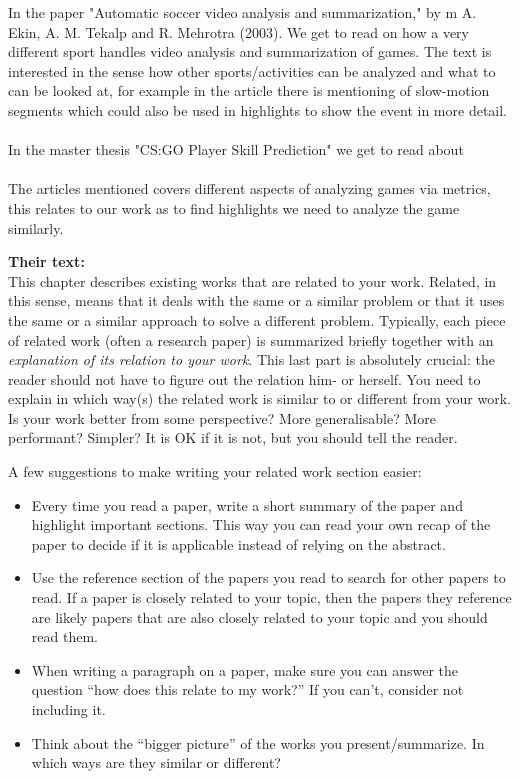 \documentclass[a4paper,twoside]{bth}
\begin{document}
In the paper  "Automatic soccer video analysis and summarization," by m A. Ekin, A. M. Tekalp and R. Mehrotra (2003). We get to read on how a very different sport handles video analysis and summarization of games. The text is interested in the sense how other sports/activities can be analyzed and what to can be looked at, for example in the article there is mentioning of slow-motion segments which could also be used in highlights to show the event in more detail.
\\\\
In the master thesis "CS:GO Player Skill Prediction" \cite{BaranNama} we get to read about 
\\\\
The articles mentioned covers different aspects of analyzing games via metrics, this relates to our work as to find highlights we need to analyze the game similarly. 


\textbf{Their text:}\\
This chapter describes existing works that are related to your work. Related, in this sense, means that it deals with the same or a similar problem or that it uses the same or a similar approach to solve a different problem. Typically, each piece of related work (often a research paper) is summarized briefly together with an \emph{explanation of its relation to your work}. This last part is absolutely crucial: the reader should not have to figure out the relation him- or herself. You need to explain in which way(s) the related work is similar to or different from your work. Is your work better from some perspective? More generalisable? More performant? Simpler? It is OK if it is not, but you should tell the reader.

A few suggestions to make writing your related work section easier:
\begin{itemize}
    \item Every time you read a paper, write a short summary of the paper and highlight important sections. This way you can read your own recap of the paper to decide if it is applicable instead of relying on the abstract.
    \item Use the reference section of the papers you read to search for other papers to read. If a paper is closely related to your topic, then the papers they reference are likely papers that are also closely related to your topic and you should read them.
    \item When writing a paragraph on a paper, make sure you can answer the question ``how does this relate to my work?'' If you can't, consider not including it. 
    \item Think about the ``bigger picture'' of the works you present/summarize. In which ways are they similar or different? 
\end{itemize}
    
\end{document}
